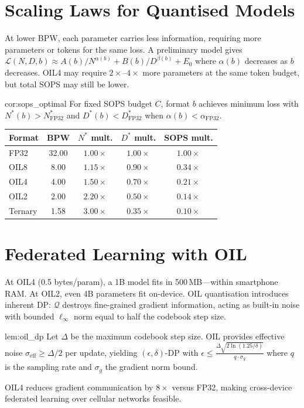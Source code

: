 \section{Scaling Laws for Quantised Models}
\label{sec:scaling_laws}
At lower BPW, each parameter carries less information, requiring more
parameters or tokens for the same loss. A preliminary model gives
$\mathcal{L}(N, D, b) \approx A(b)/N^{\alpha(b)} + B(b)/D^{\beta(b)} + E_0$
where $\alpha(b)$ decreases as $b$ decreases. OIL4 may require
$2\times$--$4\times$ more parameters at the same token budget, but total
SOPS may still be lower.
\begin{mycor}{cor:sops_optimal}
For fixed SOPS budget $C$, format $b$ achieves minimum loss with
$N^*(b) > N^*_{\text{FP32}}$ and $D^*(b) < D^*_{\text{FP32}}$ when
$\alpha(b) < \alpha_{\text{FP32}}$.
\end{mycor}
\begin{center}
\begin{tabular}{lcccc}
\toprule
\textbf{Format} & \textbf{BPW} & \textbf{$N^*$ mult.} &
\textbf{$D^*$ mult.} & \textbf{SOPS mult.} \\
\midrule
FP32    & 32.00 & $1.00\times$ & $1.00\times$ & $1.00\times$ \\
OIL8    &  8.00 & $1.15\times$ & $0.90\times$ & $0.34\times$ \\
OIL4    &  4.00 & $1.50\times$ & $0.70\times$ & $0.21\times$ \\
OIL2    &  2.00 & $2.20\times$ & $0.50\times$ & $0.14\times$ \\
Ternary &  1.58 & $3.00\times$ & $0.35\times$ & $0.10\times$ \\
\bottomrule
\end{tabular}
\end{center}

\section{Federated Learning with OIL}
\label{sec:federated_learning}
At OIL4 (0.5 bytes/param), a 1B model fits in 500\,MB---within smartphone
RAM. At OIL2, even 4B parameters fit on-device. OIL quantisation introduces
inherent DP: $\mathcal{Q}$ destroys fine-grained gradient information,
acting as built-in noise with bounded $\ell_\infty$ norm equal to half the
codebook step size.
\begin{mylemma}{lem:oil_dp}
Let $\Delta$ be the maximum codebook step size. OIL provides effective noise
$\sigma_{\text{eff}} \geq \Delta/2$ per update, yielding $(\epsilon,
\delta)$-DP with $\epsilon \leq \frac{\Delta \sqrt{2\ln(1.25/\delta)}}
{q \cdot \sigma_g}$ where $q$ is the sampling rate and $\sigma_g$ the
gradient norm bound.
\end{mylemma}
OIL4 reduces gradient communication by $8\times$ versus FP32, making
cross-device federated learning over cellular networks feasible.

